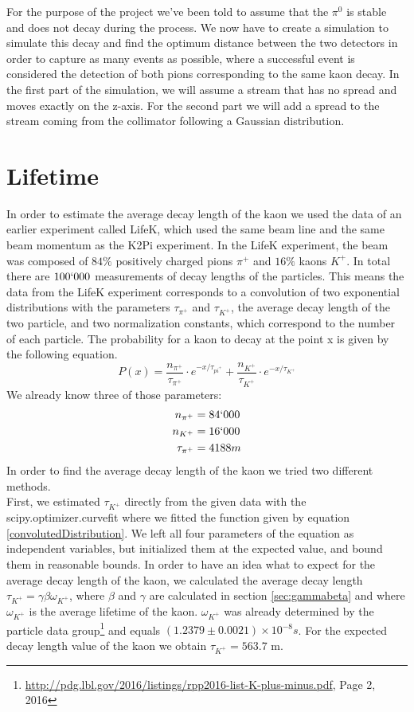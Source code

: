 \documentclass[a4paper,parskip,11pt, DIV12]{scrreprt}
\begin{document}
	For the purpose of the project we've been told to assume that the $\pi^0$ is stable and does not decay during the process. We now have to create a simulation to simulate this decay and find the optimum distance between the two detectors in order to capture as many events as possible, where a successful event is considered the detection of both pions corresponding to the same kaon decay. In the first part of the simulation, we will assume a stream that has no spread and moves exactly on the z-axis. For the second part we will add a spread to the stream coming from the collimator following a Gaussian distribution.
	
	\clearpage
	
	\chapter{Lifetime}
	
	In order to estimate the average decay length of the kaon we used the data of an earlier experiment called LifeK, which used the same beam line and the same beam momentum as the K2Pi experiment. In the LifeK experiment, the beam was composed of $84\%$ positively charged pions $\pi^+$ and $16\%$ kaons $K^+$. In total there are $100`000$ measurements of decay lengths of the particles. This means the data from the LifeK experiment corresponds to a convolution of two exponential distributions with the parameters $\tau_{\pi^+}$ and $\tau_{K^+}$, the average decay length of the two particle, and two normalization constants, which correspond to the number of each particle. The probability for a kaon to decay at the point x is given by the following equation.
	\begin{equation}
		\label{convolutedDistribution}
		P(x)=  \frac{n_{\pi^+}}{\tau_{\pi^+}} \cdot e^{-x/ \tau_{pi^+}} + \frac{n_{K^+}}{\tau_{K^+}} \cdot e^{-x/ \tau_{K^+}}
	\end{equation} 
	We already know three of those parameters:
	\begin{align*}
		n_{\pi^+} &= 84`000 \\
		n_{K^+} &= 16`000 \\
		\tau_{\pi^+} &= 4188 m
	\end{align*}
	In order to find the average decay length of the kaon we tried two different methods.\\
	First, we estimated $\tau_{K^+}$ directly from the given data with the scipy.optimizer.curvefit where we fitted the function given by equation \ref{convolutedDistribution}. We left all four parameters of the equation as independent variables, but initialized them at the expected value, and bound them in reasonable bounds. In order to have an idea what to expect for the average decay length of the kaon, we calculated the average decay length $\tau_{K^+}= \gamma \beta \omega_{K^+}$, where $\beta$ and $\gamma$ are calculated in section \ref{sec:gammabeta} and where  $\omega_{K^+}$ is the average lifetime of the kaon. $\omega_{K^+}$ was already determined by the particle data group\footnote{\url{http://pdg.lbl.gov/2016/listings/rpp2016-list-K-plus-minus.pdf}, Page 2, 2016} and equals  $(1.2379 \pm 0.0021) \times 10^{-8} s $. For the expected decay length value of the kaon we obtain $\tau_{K^+} = 563.7$ m.
	
\end{document}
